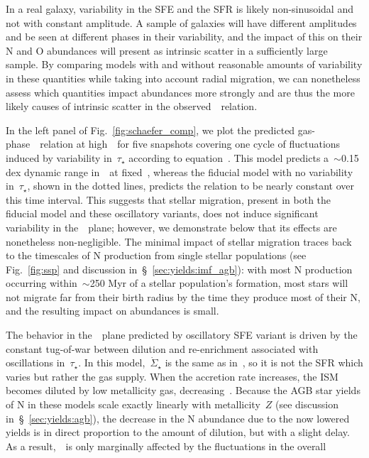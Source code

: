 \documentclass[ms.tex]{subfiles}
\begin{document}
In a real galaxy, variability in the SFE and the SFR is likely non-sinusoidal
and not with constant amplitude.
A sample of galaxies will have different amplitudes and be seen at different
phases in their variability, and the impact of this on their N and O abundances
will present as intrinsic scatter in a sufficiently large sample.
By comparing models with and without reasonable amounts of variability in these
quantities while taking into account radial migration, we can nonetheless
assess which quantities impact abundances more strongly and are thus the more
likely causes of intrinsic scatter in the observed~\ohno~relation.
\par
In the left panel of Fig.~\ref{fig:schaefer_comp}, we plot the predicted
gas-phase~\ohno~relation at high~\oh~for five snapshots covering one cycle of
fluctuations induced by variability in~$\tau_\star$ according to
equation~.
This model predicts a~$\sim$0.15 dex dynamic range in~\no~at fixed~\oh, whereas
the fiducial model with no variability in~$\tau_\star$, shown in the dotted
lines, predicts the relation to be nearly constant over this time interval.
This suggests that stellar migration, present in both the fiducial model and
these oscillatory variants, does not induce significant variability in
the~\ohno~plane; however, we demonstrate below that its effects are nonetheless
non-negligible.
The minimal impact of stellar migration traces back to the timescales of N
production from single stellar populations (see Fig.~\ref{fig:ssp} and
discussion in~\S~\ref{sec:yields:imf_agb}): with most N production occurring
within~$\sim$250 Myr of a stellar population's formation, most stars will not
migrate far from their birth radius by the time they produce most of their N,
and the resulting impact on abundances is small.
\par
The behavior in the~\ohno~plane predicted by oscillatory SFE variant
is driven by the constant tug-of-war between dilution and re-enrichment
associated with oscillations in~$\tau_\star$.
In this model,~$\dot{\Sigma}_\star$ is the same as in~\citet{Johnson2021}, so
it is not the SFR which varies but rather the gas supply.
When the accretion rate increases, the ISM becomes diluted by low metallicity
gas, decreasing~\oh.
Because the AGB star yields of N in these models scale exactly linearly with
metallicity~$Z$ (see discussion in~\S~\ref{sec:yields:agb}), the decrease in
the N abundance due to the now lowered yields is in direct proportion to the
amount of dilution, but with a slight delay.
As a result,~\no~is only marginally affected by the fluctuations in the overall
\end{document}
